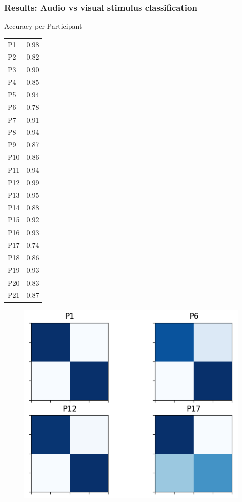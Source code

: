 \documentclass{beamer}
\begin{document}
\begin{frame}
	\frametitle{Results: Audio vs visual stimulus classification}

	\begin{multicols}{2}
		Accuracy per Participant
		\begin{tabular}{l|l}
			P1 & 0.98 \\
			P2 & 0.82 \\
			P3 & 0.90 \\
			P4 & 0.85 \\
			P5 & 0.94 \\
			P6 & 0.78 \\
			P7 & 0.91 \\
			P8 & 0.94 \\
			P9 & 0.87 \\
			P10 & 0.86 \\
			P11 & 0.94 \\
			P12 & 0.99 \\
			P13 & 0.95 \\
			P14 & 0.88 \\
			P15 & 0.92 \\
			P16 & 0.93 \\
			P17 & 0.74 \\
			P18 & 0.86 \\
			P19 & 0.93 \\
			P20 & 0.83 \\
			P21 & 0.87 \\
		\end{tabular}
		\columnbreak
		\begin{figure}
			\centering
			\includegraphics[scale=1.0]{fig15.png}
		\end{figure}

	\end{multicols}

\end{frame}
\end{document}
